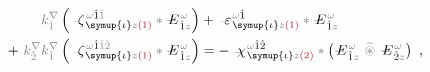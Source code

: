 \begin{subequations}
\begin{align}
	\mathcolor{gray}{k^\nabla_{\check{1}}} \left( \Xint{\begin{smallmatrix} ~ \\ {}^{}_{\mathcolor{gray}{-}} \\ ~ \end{smallmatrix}}{12}{\zeta}^{\;\! \mathcolor{gray}{\omega} \hat{1} \mathcolor{gray}{\check{1}}}_{\;\! \symup{\iota} \mathcolor{gray}{z} \textcolor{Maroon}{(1)}} \mathcolor{gray}{*} \Xint{\mathcolor{gray}{-}}{295}{E}^{\;\!\mathcolor{gray}{\omega}}_{\;\! \hat{1} \mathcolor{gray}{z}} \right) &+ \Xint{\begin{smallmatrix} ~ \\ {}^{}_{\mathcolor{gray}{-}} \\ ~ \end{smallmatrix}}{16}{\varepsilon}^{\;\! \mathcolor{gray}{\omega} \hat{1}}_{\;\! \symup{\iota} \mathcolor{gray}{z} \textcolor{Maroon}{(1)}} \mathcolor{gray}{*} \Xint{\mathcolor{gray}{-}}{295}{E}^{\;\!\mathcolor{gray}{\omega}}_{\;\! \hat{1} \mathcolor{gray}{z}}  \label{eq:nonlinear(2)-wave_wkrho-simplify2} \\ 
	+~ \mathcolor{gray}{k^\nabla_{\check{2}}} \mathcolor{gray}{k^\nabla_{\check{1}}} \left( \Xint{\begin{smallmatrix} ~ \\ {}^{}_{\mathcolor{gray}{-}} \\ ~ \end{smallmatrix}}{12}{\zeta}^{\;\! \mathcolor{gray}{\omega} \hat{1} \mathcolor{gray}{\check{1} \check{2}}}_{\;\! \symup{\iota} \mathcolor{gray}{z} \textcolor{Maroon}{(1)}} \mathcolor{gray}{*} \Xint{\mathcolor{gray}{-}}{295}{E}^{\;\!\mathcolor{gray}{\omega}}_{\;\! \hat{1} \mathcolor{gray}{z}} \right) &= - ~\Xint{{}^{}_{\mathcolor{gray}{-}}}{23}{\chi}^{\;\! \mathcolor{gray}{\omega} \hat{1} \hat{2}}_{\;\! \symup{\iota} \mathcolor{gray}{z} \textcolor{Maroon}{(2)}} \mathcolor{gray}{*} \left( \Xint{\mathcolor{gray}{-}}{295}{E}^{\;\!\mathcolor{gray}{\omega}}_{\;\! \hat{1} \mathcolor{gray}{z}} ~\mathcolor{gray}{\widetilde \circledast}~ \Xint{\mathcolor{gray}{-}}{295}{E}^{\;\!\mathcolor{gray}{\omega}}_{\;\! \hat{2} \mathcolor{gray}{z}} \right)~, \label{eq:nonlinear(2)-wave_wkrho-simplify2-2}
\end{align}
\end{subequations}
